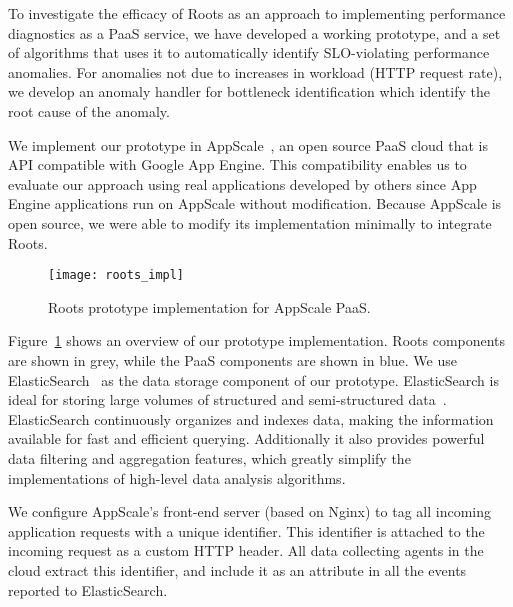 To investigate the efficacy of Roots as an approach to
implementing performance diagnostics as a PaaS service, we have developed a
working prototype, and a set of algorithms that uses it to automatically
identify SLO-violating performance anomalies.  For anomalies not due to increases
in workload (HTTP request rate), we develop an anomaly handler for bottleneck
identification which identify the root cause of the anomaly.

We implement our prototype in AppScale~\cite{6488671}, an open source PaaS cloud 
that is API compatible with Google App Engine. This compatibility enables
us to evaluate our approach using real applications developed by others since
App Engine applications run on AppScale without modification.
Because AppScale is open source,
we were able to modify its implementation minimally to integrate 
Roots. 

\begin{figure}
\centering
\texttt{[image: roots\_impl]}
\caption{Roots prototype implementation for AppScale PaaS.}
\label{fig:roots_impl}
\end{figure}

Figure~\ref{fig:roots_impl} shows an overview of our prototype implementation. Roots components
are shown in grey, while the PaaS components are shown in blue.
We use ElasticSearch~\cite{elasticsearch} as the data storage component of our prototype. ElasticSearch is ideal 
for storing large volumes of structured and semi-structured data~\cite{Kononenko:2014:MMR:2597073.2597091}. 
ElasticSearch continuously organizes and indexes data, making the information available 
for fast and efficient querying. Additionally it also provides
powerful data filtering and aggregation features, which greatly simplify the implementations of high-level
data analysis algorithms.

We configure AppScale's front-end server (based on Nginx) to tag all incoming application requests
with a unique identifier. This identifier is attached to the incoming request as a custom HTTP header.
All data collecting agents in the cloud extract this identifier, and include it as an attribute
in all the events reported to ElasticSearch. 

